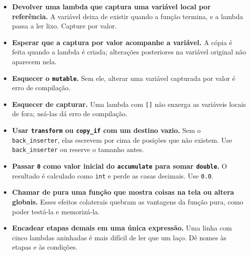 \begin{itemize}
  \item \textbf{Devolver uma lambda que captura uma variável local por referência.} A variável deixa de existir quando a função termina, e a lambda passa a ler lixo. Capture por valor.
  \item \textbf{Esperar que a captura por valor acompanhe a variável.} A cópia é feita quando a lambda é criada; alterações posteriores na variável original não aparecem nela.
  \item \textbf{Esquecer o \texttt{mutable}.} Sem ele, alterar uma variável capturada por valor é erro de compilação.
  \item \textbf{Esquecer de capturar.} Uma lambda com \texttt{[]} não enxerga as variáveis locais de fora; usá-las dá erro de compilação.
  \item \textbf{Usar \texttt{transform} ou \texttt{copy\_if} com um destino vazio.} Sem o \texttt{back\_inserter}, elas escrevem por cima de posições que não existem. Use \texttt{back\_inserter} ou reserve o tamanho antes.
  \item \textbf{Passar \texttt{0} como valor inicial do \texttt{accumulate} para somar \texttt{double}.} O resultado é calculado como \texttt{int} e perde as casas decimais. Use \texttt{0.0}.
  \item \textbf{Chamar de pura uma função que mostra coisas na tela ou altera globais.} Esses efeitos colaterais quebram as vantagens da função pura, como poder testá-la e memorizá-la.
  \item \textbf{Encadear etapas demais em uma única expressão.} Uma linha com cinco lambdas aninhadas é mais difícil de ler que um laço. Dê nomes às etapas e às condições.
\end{itemize}
